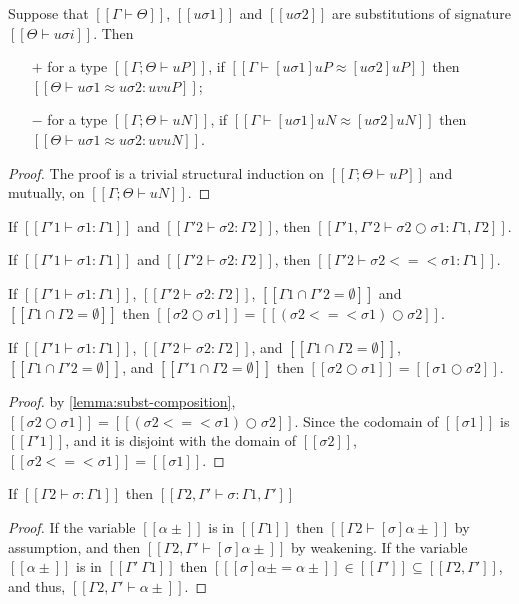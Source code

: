 \begin{lemma}
  \label{lemma:subst-equiv-metavar}
  Suppose that $[[Γ ⊢ Θ]]$, $[[uσ1]]$ and $[[uσ2]]$ are substitutions 
  of signature $[[Θ ⊢ uσi]]$.
  Then 
  \begin{enumerate}
    \item [$+$] for a type $[[Γ; Θ ⊢ uP]]$, if $[[Γ ⊢ [uσ1]uP ≈ [uσ2]uP]]$ then
      $[[Θ ⊢ uσ1 ≈ uσ2 : uv uP]]$;
    \item [$-$] for a type $[[Γ; Θ ⊢ uN]]$, if $[[Γ ⊢ [uσ1]uN ≈ [uσ2]uN]]$ then
      $[[Θ ⊢ uσ1 ≈ uσ2 : uv uN]]$.
  \end{enumerate}
\end{lemma}
\begin{proof}
  The proof is a trivial structural induction on 
  $[[Γ; Θ ⊢ uP]]$ and mutually, on $[[Γ; Θ ⊢ uN]]$.
\end{proof}


\begin{lemma}
  If $[[Γ'1 ⊢ σ1 : Γ1]]$ and $[[Γ'2 ⊢ σ2 : Γ2]]$,
  then $[[Γ'1, Γ'2 ⊢ σ2 ○ σ1 : Γ1, Γ2]]$.
\end{lemma}

\begin{lemma}
  \label{lemma:subst-monad-composition-wf}
  If $[[Γ'1 ⊢ σ1 : Γ1]]$ and $[[Γ'2 ⊢ σ2 : Γ2]]$,
  then $[[Γ'2 ⊢ σ2 <=< σ1 : Γ1]]$.
\end{lemma}

\begin{lemma}
  \label{lemma:subst-composition}
    If $[[Γ'1 ⊢ σ1 : Γ1]]$, $[[Γ'2 ⊢ σ2 : Γ2]]$, 
    $[[{Γ1} ∩ {Γ'2} = ∅ ]]$ and $[[ {Γ1} ∩ {Γ2} = ∅ ]]$ then 
    $[[ σ2 ○ σ1 ]] = [[ (σ2 <=< σ1) ○ σ2 ]]$.
\end{lemma}

\begin{corollary}
  \label{corollary:subst-composition-commutativity}
  If $[[Γ'1 ⊢ σ1 : Γ1]]$, $[[Γ'2 ⊢ σ2 : Γ2]]$, and
  $[[ {Γ1} ∩ {Γ2} = ∅ ]]$, 
  $[[ {Γ1} ∩ {Γ'2} = ∅ ]]$, and
  $[[ {Γ'1} ∩ {Γ2} = ∅ ]]$ then 
  $[[ σ2 ○ σ1 ]] = [[ σ1 ○ σ2 ]]$.
\end{corollary}
\begin{proof}
  by \cref{lemma:subst-composition},
    $[[ σ2 ○ σ1 ]] = [[ (σ2 <=< σ1) ○ σ2 ]]$.
    Since the codomain of $[[σ1]]$ is $[[Γ'1]]$,
    and it is disjoint with the domain of $[[σ2]]$,
    $[[σ2 <=< σ1]] = [[σ1]]$.
\end{proof}

\begin{lemma}
  \label{lemma:subst-domain-weakening}
  If $[[Γ2 ⊢ σ : Γ1]]$ then $[[Γ2, Γ' ⊢ σ : Γ1, Γ']]$
\end{lemma}
\begin{proof}
  If the variable $[[α±]]$ is in $[[Γ1]]$ then $[[Γ2 ⊢ [σ]α± ]]$ by assumption,
  and then $[[Γ2, Γ' ⊢ [σ]α± ]]$ by weakening.
  If the variable $[[α±]]$ is in $[[{Γ'} \ {Γ1}]]$ then $[[ [σ]α± = α± ]] \in [[Γ']] ⊆ [[Γ2, Γ']]$, 
  and thus, $[[Γ2, Γ' ⊢ α± ]]$.
\end{proof}

